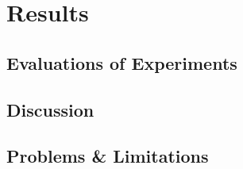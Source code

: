 \chapter{Results}

\section{Evaluations of Experiments}
\section{Discussion}
\section{Problems \& Limitations}